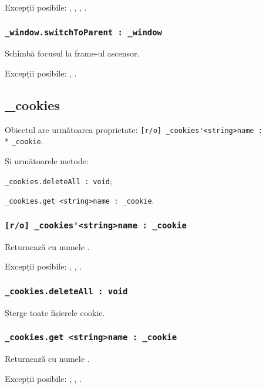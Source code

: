 Excepții posibile: , , , .

\subsubsection{\lstinline|_window.switchToParent : _window|}

Schimbă focusul la frame-ul ascensor.

Excepții posibile: , .

\subsection{{\color{orange} \_cookies}}

Obiectul \cookies{} are următoarea proprietate: \lstinline|[r/o] _cookies'<string>name :|\\* \lstinline|_cookie|.

Și următoarele metode: 
\begin{icItems}
	\item \lstinline|_cookies.deleteAll : void|;
	\item \lstinline|_cookies.get <string>name : _cookie|.
\end{icItems}

\subsubsection{\lstinline|[r/o] _cookies'<string>name : _cookie|}

Returnează \cookie{} cu numele .

Excepții posibile: , , .

\subsubsection{\lstinline|_cookies.deleteAll : void|}

Șterge toate fișierele cookie.

\subsubsection{\lstinline|_cookies.get <string>name : _cookie|}

Returnează \cookie{} cu numele .

Excepții posibile: , , .

